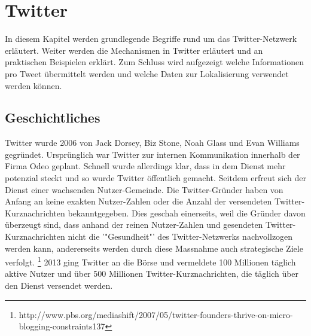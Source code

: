 	\section{Twitter} 
	In diesem Kapitel werden grundlegende Begriffe rund um das Twitter-Netzwerk erläutert. 
	Weiter werden die Mechanismen in Twitter erläutert und an praktischen Beispielen erklärt. 
	Zum Schluss wird aufgezeigt welche Informationen pro Tweet übermittelt werden und welche Daten zur Lokalisierung verwendet werden können.

		\subsection{Geschichtliches}
		Twitter wurde 2006 von Jack Dorsey, Biz Stone, Noah Glass und Evan Williams gegründet.
		Ursprünglich war Twitter zur internen Kommunikation innerhalb der Firma Odeo geplant.
		Schnell wurde allerdings klar, dass in dem Dienst mehr potenzial steckt und so wurde Twitter öffentlich gemacht.
		Seitdem erfreut sich der Dienst einer wachsenden Nutzer-Gemeinde.
		Die Twitter-Gründer haben von Anfang an keine exakten Nutzer-Zahlen oder die Anzahl der versendeten Twitter-Kurznachrichten bekanntgegeben.
		Dies geschah einerseits, weil die Gründer davon überzeugt sind, dass anhand der reinen Nutzer-Zahlen und gesendeten Twitter-Kurznachrichten nicht die '"Gesundheit"' des Twitter-Netzwerks nachvollzogen werden kann, andererseits werden durch diese Massnahme auch strategische Ziele verfolgt.  \footnote{http://www.pbs.org/mediashift/2007/05/twitter-founders-thrive-on-micro-blogging-constraints137}
		2013 ging Twitter an die Börse und vermeldete 100 Millionen täglich aktive Nutzer und über 500 Millionen Twitter-Kurznachrichten, die täglich über den Dienst versendet werden. 

